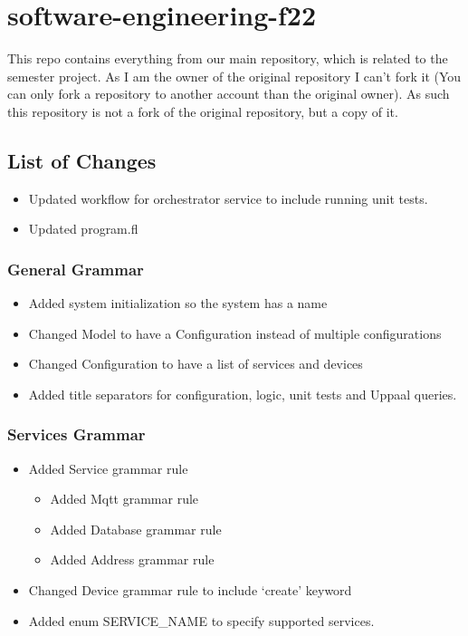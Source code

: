 \hypertarget{software-engineering-f22}{%
\section{software-engineering-f22}\label{software-engineering-f22}}

This repo contains everything from our main repository, which is related
to the semester project. As I am the owner of the original repository I
can't fork it (You can only fork a repository to another account than
the original owner). As such this repository is not a fork of the
original repository, but a copy of it.

\hypertarget{list-of-changes}{%
\subsection{List of Changes}\label{list-of-changes}}

\begin{itemize}
\tightlist
\item
  Updated workflow for orchestrator service to include running unit
  tests.
\item
  Updated program.fl
\end{itemize}

\hypertarget{general-grammar}{%
\subsubsection{General Grammar}\label{general-grammar}}

\begin{itemize}
\tightlist
\item
  Added system initialization so the system has a name
\item
  Changed Model to have a Configuration instead of multiple
  configurations
\item
  Changed Configuration to have a list of services and devices
\item
  Added title separators for configuration, logic, unit tests and Uppaal
  queries.
\end{itemize}

\hypertarget{services-grammar}{%
\subsubsection{Services Grammar}\label{services-grammar}}

\begin{itemize}
\tightlist
\item
  Added Service grammar rule

  \begin{itemize}
  \tightlist
  \item
    Added Mqtt grammar rule
  \item
    Added Database grammar rule
  \item
    Added Address grammar rule
  \end{itemize}
\item
  Changed Device grammar rule to include `create' keyword
\item
  Added enum SERVICE\_NAME to specify supported services.
\end{itemize}

